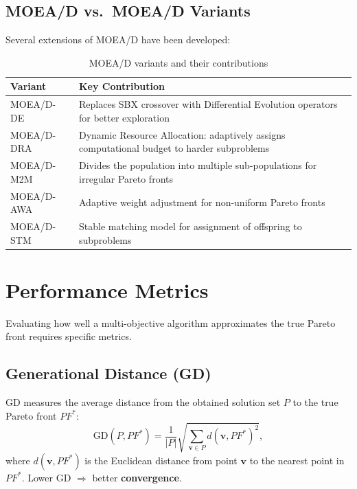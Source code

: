 \documentclass[12pt,a4paper]{article}
\begin{document}
\subsection{MOEA/D vs.\ MOEA/D Variants}

Several extensions of MOEA/D have been developed:

\begin{table}[H]
\centering
\caption{MOEA/D variants and their contributions}
\label{tab:moead_variants}
\renewcommand{\arraystretch}{1.3}
\begin{tabular}{p{3.5cm} p{9cm}}
\toprule
\textbf{Variant} & \textbf{Key Contribution} \\
\midrule
MOEA/D-DE & Replaces SBX crossover with Differential Evolution operators for better exploration \\
MOEA/D-DRA & Dynamic Resource Allocation: adaptively assigns computational budget to harder subproblems \\
MOEA/D-M2M & Divides the population into multiple sub-populations for irregular Pareto fronts \\
MOEA/D-AWA & Adaptive weight adjustment for non-uniform Pareto fronts \\
MOEA/D-STM & Stable matching model for assignment of offspring to subproblems \\
\bottomrule
\end{tabular}
\end{table}

\section{Performance Metrics}
\label{sec:metrics}

Evaluating how well a multi-objective algorithm approximates the true Pareto front requires specific metrics.

\subsection{Generational Distance (GD)}

GD measures the average distance from the obtained solution set $P$ to the true Pareto front $PF^*$:
\begin{equation}
    \text{GD}(P, PF^*) = \frac{1}{|P|} \sqrt{ \sum_{\mathbf{v} \in P} d(\mathbf{v}, PF^*)^2 },
\end{equation}
where $d(\mathbf{v}, PF^*)$ is the Euclidean distance from point $\mathbf{v}$ to the nearest point in $PF^*$. Lower GD $\Rightarrow$ better \textbf{convergence}.
\end{document}
